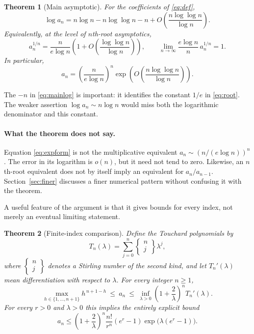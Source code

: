 \documentclass[11pt]{article}
\numberwithin{equation}{section}
\newtheorem{theorem}{Theorem}[section]
\theoremstyle{remark}
\newcommand{\ST}[2]{\left\{\begin{matrix}#1\\#2\end{matrix}\right\}}
\begin{document}
\begin{theorem}[Main asymptotic]\label{thm:main}
For the coefficients of \eqref{eq:def},
\begin{equation}\label{eq:mainlog}
 \log a_n=n\log n-n\log\log n-n
       +O\!\left(\frac{n\log\log n}{\log n}\right).
\end{equation}
Equivalently, at the level of $n$th-root asymptotics,
\begin{equation}\label{eq:root}
 \boxed{\displaystyle
 a_n^{1/n}=\frac{n}{e\log n}
       \left(1+O\!\left(\frac{\log\log n}{\log n}\right)\right),
 \qquad
 \lim_{n\to\infty}\frac{e\log n}{n}\,a_n^{1/n}=1.}
\end{equation}
In particular,
\begin{equation}\label{eq:expform}
 a_n=\left(\frac{n}{e\log n}\right)^n
        \exp\!\left(O\!\left(\frac{n\log\log n}{\log n}\right)\right).
\end{equation}
\end{theorem}

The $-n$ in \eqref{eq:mainlog} is important: it identifies the constant
$1/e$ in \eqref{eq:root}. The weaker assertion $\log a_n\sim n\log n$
would miss both the logarithmic denominator and this constant.

\paragraph{What the theorem does not say.}
Equation \eqref{eq:expform} is not the multiplicative equivalent
$a_n\sim(n/(e\log n))^n$. The error in its logarithm is $o(n)$, but it
need not tend to zero. Likewise, an $n$th-root equivalent does not by
itself imply an equivalent for $a_n/a_{n-1}$. Section~\ref{sec:finer}
discusses a finer numerical pattern without confusing it with the theorem.

A useful feature of the argument is that it gives bounds for every index,
not merely an eventual limiting statement.

\begin{theorem}[Finite-index comparison]\label{thm:finite}
Define the Touchard polynomials by
\begin{equation}\label{eq:touchard}
 T_n(\lambda)=\sum_{j=0}^n\ST{n}{j}\lambda^j,
\end{equation}
where $\ST{n}{j}$ denotes a Stirling number of the second kind, and let
$T_n'(\lambda)$ mean differentiation with respect to $\lambda$.
For every integer $n\ge1$,
\begin{equation}\label{eq:finite}
 \boxed{\displaystyle
 \max_{h\in\{1,\ldots,n+1\}}h^{\,n+1-h}
 \ \le\ a_n\ \le\
 \inf_{\lambda>0}\left(1+\frac2\lambda\right)^nT_n'(\lambda).}
\end{equation}
For every $r>0$ and $\lambda>0$ this implies the entirely explicit bound
\begin{equation}\label{eq:cauchyupper}
 a_n\le
 \left(1+\frac2\lambda\right)^n
 \frac{n!}{r^n}(e^r-1)\exp\!\bigl(\lambda(e^r-1)\bigr).
\end{equation}
\end{theorem}
\end{document}
